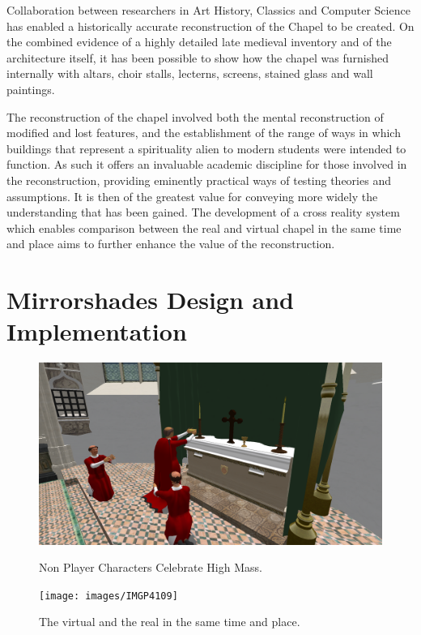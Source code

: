 \documentclass[conference]{acmsiggraph}
\begin{document}
Collaboration between researchers in Art History, Classics and Computer Science has enabled a historically accurate reconstruction of the Chapel to be created. On the combined evidence of a highly detailed late medieval inventory and of the architecture itself, it has been possible to show how the chapel was furnished internally with altars, choir stalls, lecterns, screens, stained glass and wall paintings. 

The reconstruction of the chapel involved both the mental reconstruction of modified and lost features, and the establishment of the range of ways in which buildings that represent a spirituality alien to modern students were intended to function. As such it offers an invaluable academic discipline for those involved in the reconstruction, providing eminently practical ways of testing theories and assumptions. It is then of the greatest value for conveying more widely the understanding that has been gained. The development of a cross reality system which enables comparison between the real and virtual chapel in the same time and place aims to further enhance the value of the reconstruction. 

\section{Mirrorshades Design and Implementation}

\begin{figure}[tp!]
	\centering
	\begin{minipage}[t]{\linewidth}
		\centering
		\includegraphics[width=\linewidth]{images/Snapshot_001}
		\caption{Non Player Characters Celebrate High Mass.} 
		\label{erosion}
	\end{minipage}
	\begin{minipage}[t]{\linewidth}
		\centering
		\texttt{[image: images/IMGP4109]}
		\caption{The virtual and the real in the same time and place.} 
		\label{erosion}
	\end{minipage}
\end{figure}
\end{document}
